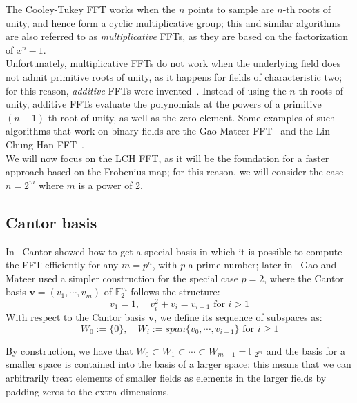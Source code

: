     The Cooley-Tukey FFT works when the $n$ points to sample are $n$-th roots of unity, and hence form a cyclic multiplicative group;
    this and similar algorithms are also referred to as \textit{multiplicative} FFTs, as they are based on the factorization of $x^n-1$.\\
    Unfortunately, multiplicative FFTs do not work when the underlying field does not admit primitive roots of unity, as it happens for fields
    of characteristic two; for this reason, \textit{additive} FFTs were invented~\cite{wang1988fast,cantor1989arithmetical}.
    Instead of using the $n$-th roots of unity, additive FFTs evaluate the polynomials at the powers of a primitive $(n-1)$-th root of unity,
    as well as the zero element. Some examples of such algorithms that work on binary fields are the Gao-Mateer FFT~\cite{gao2010additive} 
    and the Lin-Chung-Han FFT~\cite{lin2014novel}.\\
    We will now focus on the LCH FFT, as it will be the foundation for a faster approach based on the Frobenius map; for this reason, we will
    consider the case $n=2^m$ where $m$ is a power of 2.


\subsection{Cantor basis}
In~\cite{cantor1989arithmetical} Cantor showed how to get a special basis in which it is possible to compute the FFT efficiently
    for any $m = p^n$, with $p$ a prime number; later in~\cite{gao2010additive} Gao and Mateer used a simpler construction for the special case
    $p=2$, where the Cantor basis $\mathbf{v} = (v_1, \cdots, v_{m})$ of $\mathds{F}_2^m$ follows the structure:
    \begin{equation}
        v_1 = 1, \quad v_i^2+v_i = v_{i-1} \text{ for } i > 1
    \end{equation}
    With respect to the Cantor basis $\mathbf{v}$, we define its sequence of subspaces as:
    \begin{equation}
        W_0 := \{0\}, \quad W_i := span\{v_0, \cdots, v_{i-1}\} \text{ for } i \geqslant 1
    \end{equation}

    By construction, we have that $W_0 \subset W_1 \subset \cdots \subset W_{m-1} = \mathds{F}_{2^m}$ 
    and the basis for a smaller space is contained into the basis of a larger space: this means that 
    we can arbitrarily treat elements of smaller fields as elements in the larger fields by padding zeros to the extra dimensions.

